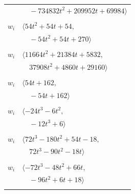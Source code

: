 \documentclass[11pt]{article}
\begin{document}
\begin{longtable}{@{}ll@{}}
 & $\quad -734832t^{2}+209952t+69984\rangle$\\
\addlinespace[2pt]
\multicolumn{2}{@{}p{0.97\textwidth}@{}}{$i=14$, $D_i=6$, $e_i=1$, $\rho_{ij}$: $19{:}1, \allowbreak 27{:}1, \allowbreak 31{:}1, \allowbreak 37{:}2$}\\
$w_i$ & $\langle 54t^{2}+54t+54,$\\
 & $\quad -54t^{2}+54t+270\rangle$\\
\addlinespace[2pt]
\multicolumn{2}{@{}p{0.97\textwidth}@{}}{$i=15$, $D_i=18$, $e_i=1$, $\rho_{ij}$: $18{:}2, \allowbreak 22{:}2, \allowbreak 23{:}2, \allowbreak 24{:}1, \allowbreak 29{:}2, \allowbreak 30{:}2, \allowbreak 32{:}2, \allowbreak 40{:}1$}\\
$w_i$ & $\langle 11664t^{2}+21384t+5832,$\\
 & $\quad 37908t^{2}+4860t+29160\rangle$\\
\addlinespace[2pt]
\multicolumn{2}{@{}p{0.97\textwidth}@{}}{$i=16$, $D_i=6$, $e_i=2$, $\rho_{ij}$: $17{:}1, \allowbreak 19{:}1, \allowbreak 21{:}2, \allowbreak 29{:}2, \allowbreak 39{:}1$}\\
$w_i$ & $\langle 54t+162,$\\
 & $\quad -54t+162\rangle$\\
\addlinespace[2pt]
\multicolumn{2}{@{}p{0.97\textwidth}@{}}{$i=17$, $D_i=2$, $\rho_{ij}$: $1{:}1, \allowbreak 2{:}2, \allowbreak 8{:}1, \allowbreak 9{:}2, \allowbreak 13{:}2, \allowbreak 16{:}2$}\\
$w_i$ & $\langle -24t^{3}-6t^{2},$\\
 & $\quad -12t^{3}+6\rangle$\\
\addlinespace[2pt]
\multicolumn{2}{@{}p{0.97\textwidth}@{}}{$i=18$, $D_i=4$, $\rho_{ij}$: $1{:}2, \allowbreak 4{:}2, \allowbreak 13{:}2, \allowbreak 15{:}1, \allowbreak 22{:}1, \allowbreak 40{:}1, \allowbreak 41{:}2$}\\
$w_i$ & $\langle 72t^{3}-180t^{2}+54t-18,$\\
 & $\quad 72t^{3}-90t^{2}-18t\rangle$\\
\addlinespace[2pt]
\multicolumn{2}{@{}p{0.97\textwidth}@{}}{$i=19$, $D_i=2$, $\rho_{ij}$: $9{:}1, \allowbreak 14{:}2, \allowbreak 16{:}2, \allowbreak 28{:}2, \allowbreak 29{:}1, \allowbreak 37{:}1, \allowbreak 39{:}2$}\\
$w_i$ & $\langle -72t^{3}-48t^{2}+66t,$\\
 & $\quad -96t^{2}+6t+18\rangle$\\
\addlinespace[2pt]
\multicolumn{2}{@{}p{0.97\textwidth}@{}}{$i=20$, $D_i=12$, $\rho_{ij}$: $0{:}1, \allowbreak 4{:}2, \allowbreak 6{:}2, \allowbreak 11{:}2, \allowbreak 22{:}2, \allowbreak 37{:}1, \allowbreak 43{:}2$}\\

\end{longtable}
\end{document}
